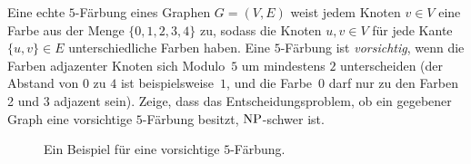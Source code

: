 \documentclass{uebung_cs}
\begin{document}

\begin{exercise}
    Eine echte $5$-Färbung eines Graphen $G = (V,E)$ weist jedem Knoten ${v \in V}$ eine Farbe aus der Menge $\{0,1,2,3,4\}$ zu, sodass die Knoten $u,v \in V$ für jede Kante $\{u,v\} \in E$ unterschiedliche Farben haben. Eine $5$-Färbung ist \textit{vorsichtig}, wenn die Farben adjazenter Knoten sich Modulo~$5$ um mindestens $2$ unterscheiden (der Abstand von $0$ zu $4$ ist beispielsweise~$1$, und die Farbe~0 darf nur zu den Farben 2 und 3 adjazent sein). Zeige, dass das Entscheidungsproblem, ob ein gegebener Graph eine vorsichtige $5$-Färbung besitzt, $\mathrm{NP}$-schwer ist.


    \begin{figure}[ht]
        \begin{center}
            \caption{Ein Beispiel für eine vorsichtige $5$-Färbung.}
        \end{center}
    \end{figure}
\end{exercise}
\end{document}
